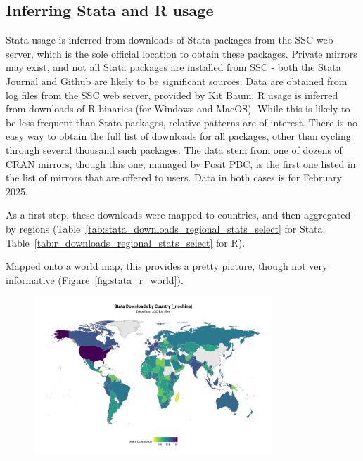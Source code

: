 \documentclass{Revue-economique}
\begin{document}
\begin{Article} [%
	Titre={Reproducibility and Open Science in Economics},
	Auteur={Lars Vilhuber\thanks{Cornell University, lars.vilhuber@cornell.edu}}]
\begin{refsection}[Main]
\begin{appendices}
\subsection*{Inferring Stata and R usage}

Stata usage is inferred from downloads of Stata packages from the SSC web server, which is the sole official location to obtain these packages. Private mirrors may exist, and not all Stata packages are installed from SSC - both the Stata Journal and Github are likely to be significant sources. Data are obtained from log files from the SSC web server, provided by Kit Baum. R usage is inferred from downloads of  R binaries (for Windows and MacOS). While this is likely to be less frequent than Stata packages, relative patterns are of interest. There is no easy way to obtain the full list of downloads for all packages, other than cycling through several thousand such packages. The data stem from one of dozens of \ac{CRAN} mirrors, though this one, managed by Posit PBC, is the first one listed in the list of mirrors that are offered to users. Data in both cases is for February 2025.

As a first step, these downloads were mapped to countries, and then aggregated by regions (Table~\ref{tab:stata_downloads_regional_stats_select} for Stata, Table~\ref{tab:r_downloads_regional_stats_select} for R).
%
%


%
Mapped onto a world map, this provides a pretty picture, though not very informative (Figure~\ref{fig:stata_r_world}).
\begin{figure}
	\centering
	\includegraphics[width=0.8\textwidth]{outputs/stata_downloads_world_map_select_nochina.png}
	

\end{figure}
\end{appendices}
\end{refsection}
\end{Article}
\end{document}
